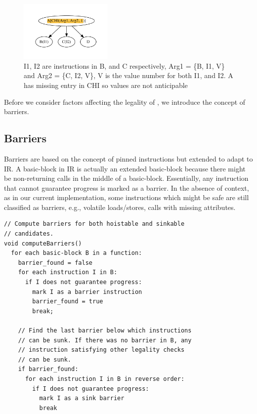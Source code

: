 \documentclass[sigplan,10pt,review,anonymous]{acmart}\settopmatter{printfolios=true,printccs=false,printacmref=false}
\begin{document}
\begin{figure}
  \includegraphics[width=0.4\textwidth]{chi-example2.pdf}
  \vspace*{-1.0cm}
\caption{I1, I2 are instructions in B, and C respectively, Arg1 = \{B, I1, V\}
  and Arg2 = \{C, I2, V\}, V is the value number for both I1, and I2. A has
  missing entry in CHI so values are not anticipable}
\label{fig:chi-intro2}
\end{figure}

Before we consider factors affecting the legality of \GCM{}, we introduce the
concept of barriers.

\subsection{Barriers}
\label{subsec:barriers}
Barriers are based on the concept of pinned instructions \cite{click1995global}
but extended to adapt to \LLVM{} IR. A basic-block in \LLVM{} IR is actually an
extended basic-block because there might be non-returning calls in the middle of
a basic-block. Essentially, any instruction that cannot guarantee progress is
marked as a barrier. In the absence of context, as in our current
implementation, some instructions which might be safe are still classified as
barriers, e.g., volatile loads/stores, calls with missing attributes.

\begin{verbatim}
// Compute barriers for both hoistable and sinkable
// candidates.
void computeBarriers()
  for each basic-block B in a function:
    barrier_found = false
    for each instruction I in B:
      if I does not guarantee progress:
        mark I as a barrier instruction
        barrier_found = true
        break;

    // Find the last barrier below which instructions
    // can be sunk. If there was no barrier in B, any
    // instruction satisfying other legality checks
    // can be sunk.
    if barrier_found:
      for each instruction I in B in reverse order:
        if I does not guarantee progress:
          mark I as a sink barrier
          break
\end{verbatim}
\end{document}
